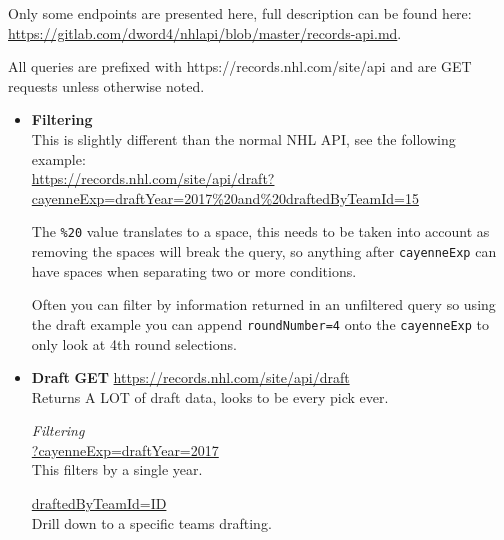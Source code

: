 \documentclass[11pt]{article}
\begin{document}
    Only some endpoints are presented here, full description can be found here: \url{https://gitlab.com/dword4/nhlapi/blob/master/records-api.md}.

    All queries are prefixed with https://records.nhl.com/site/api and are GET requests unless otherwise noted.

    \begin{itemize}
        \item \textbf{Filtering} \\

            This is slightly different than the normal NHL API, see the following example: \\
            \url{https://records.nhl.com/site/api/draft?cayenneExp=draftYear=2017\%20and\%20draftedByTeamId=15}

            The \texttt{\%20} value translates to a space, this needs to be taken into account as removing the spaces will break the query, so anything after \texttt{cayenneExp} can have spaces when separating two or more conditions.

            Often you can filter by information returned in an unfiltered query so using the draft example you can append \texttt{roundNumber=4} onto the \texttt{cayenneExp} to only look at 4th round selections.

        \item \textbf{Draft}
            \textbf{GET} \url{https://records.nhl.com/site/api/draft} \\
            Returns A LOT of draft data, looks to be every pick ever.

            \textit{Filtering} \\
            \url{?cayenneExp=draftYear=2017} \\
            This filters by a single year.

            \url{draftedByTeamId=ID} \\
            Drill down to a specific teams drafting.

    \end{itemize}
\end{document}

